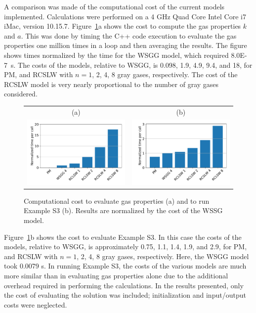 \documentclass[preprint,12pt]{elsarticle}
\begin{document}
A comparison was made of the computational cost of the current models implemented. Calculations were performed on a 4 GHz Quad Core Intel Core i7 iMac, version 10.15.7. Figure~\ref{f:cost}a shows the cost to compute the gas properties $k$ and $a$. This was done by timing the C++ code execution to evaluate the gas properties one million times in a loop and then averaging the results. The figure shows times normalized by the time for the WSGG model, which required 8.0E-7~s. The costs of the models, relative to WSGG, is 0.098, 1.9, 4.9, 9.4, and 18, for PM, and RCSLW with $n=1$, 2, 4, 8 gray gases, respectively. The cost of the RCSLW model is very nearly proportional to the number of gray gases considered.
%
\begin{figure}
    \begin{center}
    \begin{tabular}{c c}
        (a) & (b) \\
        \includegraphics[width=2.75 in]{fig_getka_c++.pdf} &
        \includegraphics[width=2.75 in]{fig_exS3_c++.pdf}
    \end{tabular}
    \caption{Computational cost to evaluate gas properties (a) and to run Example S3 (b). Results are normalized by the cost of the WSSG model.}
    \label{f:cost}
    \end{center}
\end{figure}
%

Figure~\ref{f:cost}b shows the cost to evaluate Example S3. 
In this case the costs of the models, relative to WSGG, is approximately 0.75, 1.1, 1.4, 1.9, and 2.9, for PM, and RCSLW with $n=1$, 2, 4, 8 gray gases, respectively. Here, the WSGG model took 0.0079 s. In running Example S3, the costs of the various models are much more similar than in evaluating gas properties alone due to the additional overhead required in performing the calculations. In the results presented, only the cost of evaluating the solution was included; initialization and input/output costs were neglected.
\end{document}
